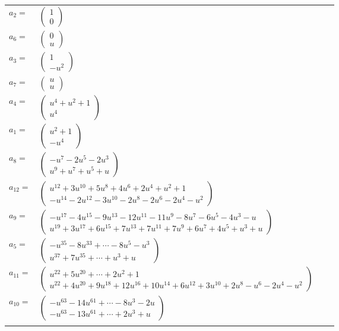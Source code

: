 \documentclass[1p]{elsarticle_modified}
\theoremstyle{definition}
\begin{document}
\begin{tabular}{m{7pt} m{180pt} m{7pt} m{180pt} }
\flushright $a_{2}=$&$\begin{pmatrix}1\\0\end{pmatrix}$ \\
\flushright $a_{6}=$&$\begin{pmatrix}0\\u\end{pmatrix}$ \\
\flushright $a_{3}=$&$\begin{pmatrix}1\\- u^2\end{pmatrix}$ \\
\flushright $a_{7}=$&$\begin{pmatrix}u\\u\end{pmatrix}$ \\
\flushright $a_{4}=$&$\begin{pmatrix}u^4+u^2+1\\u^4\end{pmatrix}$ \\
\flushright $a_{1}=$&$\begin{pmatrix}u^2+1\\- u^4\end{pmatrix}$ \\
\flushright $a_{8}=$&$\begin{pmatrix}- u^7-2 u^5-2 u^3\\u^9+u^7+u^5+u\end{pmatrix}$ \\
\flushright $a_{12}=$&$\begin{pmatrix}u^{12}+3 u^{10}+5 u^8+4 u^6+2 u^4+u^2+1\\- u^{14}-2 u^{12}-3 u^{10}-2 u^8-2 u^6-2 u^4- u^2\end{pmatrix}$ \\
\flushright $a_{9}=$&$\begin{pmatrix}- u^{17}-4 u^{15}-9 u^{13}-12 u^{11}-11 u^9-8 u^7-6 u^5-4 u^3- u\\u^{19}+3 u^{17}+6 u^{15}+7 u^{13}+7 u^{11}+7 u^9+6 u^7+4 u^5+u^3+u\end{pmatrix}$ \\
\flushright $a_{5}=$&$\begin{pmatrix}- u^{35}-8 u^{33}+\cdots-8 u^5- u^3\\u^{37}+7 u^{35}+\cdots+u^3+u\end{pmatrix}$ \\
\flushright $a_{11}=$&$\begin{pmatrix}u^{22}+5 u^{20}+\cdots+2 u^2+1\\u^{22}+4 u^{20}+9 u^{18}+12 u^{16}+10 u^{14}+6 u^{12}+3 u^{10}+2 u^8- u^6-2 u^4- u^2\end{pmatrix}$ \\
\flushright $a_{10}=$&$\begin{pmatrix}- u^{63}-14 u^{61}+\cdots-8 u^3-2 u\\- u^{63}-13 u^{61}+\cdots+2 u^3+u\end{pmatrix}$\\&\end{tabular}
\end{document}
